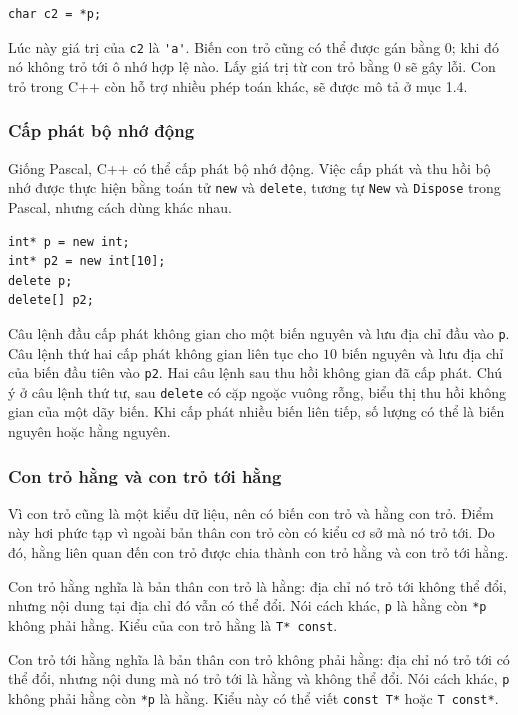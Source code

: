 \documentclass[11pt]{article}
\newcommand{\cpp}{C++}
\newcommand{\pascal}{Pascal}
\begin{document}
\begin{verbatim}
char c2 = *p;
\end{verbatim}

Lúc này giá trị của \verb|c2| là \verb|'a'|. Biến con trỏ cũng có thể được gán
bằng \(0\); khi đó nó không trỏ tới ô nhớ hợp lệ nào. Lấy giá trị từ con trỏ
bằng \(0\) sẽ gây lỗi. Con trỏ trong \cpp{} còn hỗ trợ nhiều phép toán khác,
sẽ được mô tả ở mục 1.4.

\subsubsection*{Cấp phát bộ nhớ động}

Giống \pascal{}, \cpp{} có thể cấp phát bộ nhớ động. Việc cấp phát và thu hồi
bộ nhớ được thực hiện bằng toán tử \verb|new| và \verb|delete|, tương tự
\verb|New| và \verb|Dispose| trong \pascal{}, nhưng cách dùng khác nhau.

\begin{verbatim}
int* p = new int;
int* p2 = new int[10];
delete p;
delete[] p2;
\end{verbatim}

Câu lệnh đầu cấp phát không gian cho một biến nguyên và lưu địa chỉ đầu vào
\verb|p|. Câu lệnh thứ hai cấp phát không gian liên tục cho \(10\) biến nguyên
và lưu địa chỉ của biến đầu tiên vào \verb|p2|. Hai câu lệnh sau thu hồi không
gian đã cấp phát. Chú ý ở câu lệnh thứ tư, sau \verb|delete| có cặp ngoặc
vuông rỗng, biểu thị thu hồi không gian của một dãy biến. Khi cấp phát nhiều
biến liên tiếp, số lượng có thể là biến nguyên hoặc hằng nguyên.

\subsubsection*{Con trỏ hằng và con trỏ tới hằng}

Vì con trỏ cũng là một kiểu dữ liệu, nên có biến con trỏ và hằng con trỏ.
Điểm này hơi phức tạp vì ngoài bản thân con trỏ còn có kiểu cơ sở mà nó trỏ
tới. Do đó, hằng liên quan đến con trỏ được chia thành con trỏ hằng và con
trỏ tới hằng.

Con trỏ hằng nghĩa là bản thân con trỏ là hằng: địa chỉ nó trỏ tới không thể
đổi, nhưng nội dung tại địa chỉ đó vẫn có thể đổi. Nói cách khác, \verb|p| là
hằng còn \verb|*p| không phải hằng. Kiểu của con trỏ hằng là \verb|T* const|.

Con trỏ tới hằng nghĩa là bản thân con trỏ không phải hằng: địa chỉ nó trỏ tới
có thể đổi, nhưng nội dung mà nó trỏ tới là hằng và không thể đổi. Nói cách
khác, \verb|p| không phải hằng còn \verb|*p| là hằng. Kiểu này có thể viết
\verb|const T*| hoặc \verb|T const*|.
\end{document}

